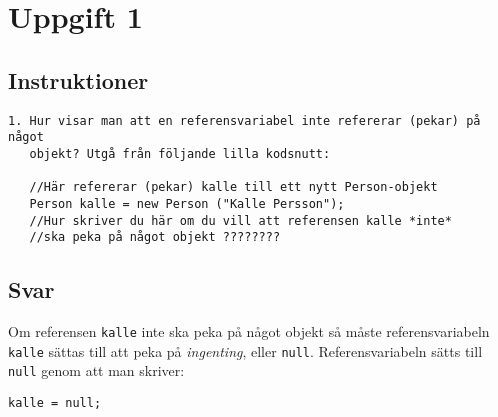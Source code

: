 \section{Uppgift 1}\label{sec:uppg01}

\subsection{Instruktioner}
\begin{verbatim}
1. Hur visar man att en referensvariabel inte refererar (pekar) på något
   objekt? Utgå från följande lilla kodsnutt:

   //Här refererar (pekar) kalle till ett nytt Person-objekt
   Person kalle = new Person ("Kalle Persson");
   //Hur skriver du här om du vill att referensen kalle *inte*
   //ska peka på något objekt ????????
\end{verbatim}


\subsection{Svar}
Om referensen \texttt{kalle} inte ska peka på något objekt så måste
referensvariabeln \texttt{kalle} sättas till att peka på \emph{ingenting},
eller \texttt{null}.  Referensvariabeln sätts till \texttt{null} genom att man
skriver:
\begin{verbatim}kalle = null;\end{verbatim}





